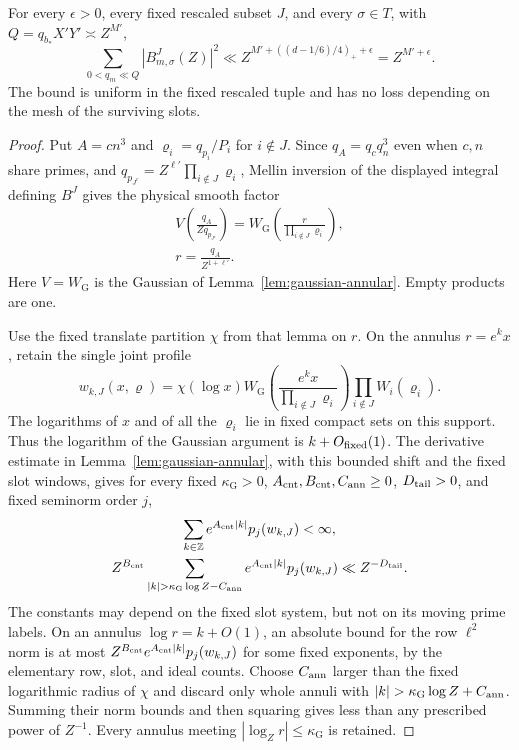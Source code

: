 \begin{lemma}\label{lem:probe-row-norm}
For every $\epsilon>0$, every fixed rescaled subset $J$, and every
$\sigma\in T$, with $Q=q_{b_*}X'Y'\asymp Z^{M'}$,
\begin{equation}
 \sum_{0<q_m\ll Q}|B^J_{m,\sigma}(Z)|^2
       \ll Z^{M'+((d-1/6)/4)_++\epsilon}
       =Z^{M'+\epsilon}.
 \label{old-eq:5.4}
\end{equation}
The bound is uniform in the fixed rescaled tuple and has no
loss depending on the mesh of the surviving slots.
\end{lemma}

\begin{proof}
Put $A=cn^3$ and $\varrho_i=q_{p_i}/P_i$ for $i\notin J$.  Since
$q_A=q_cq_n^3$ even when $c,n$ share primes, and
$q_{p_{J^c}}=Z^{\ell'}\prod_{i\notin J}\varrho_i$, Mellin inversion
of the displayed integral defining $B^J$ gives the physical smooth factor
\[
 \begin{gathered}
 V\!\left(\frac{q_A}{Zq_{p_{J^c}}}\right)
 =W_{\mathrm G}\!\left(\frac{r}{\prod_{i\notin J}\varrho_i}\right),\\
 r=\frac{q_A}{Z^{1+\ell'}}.
 \end{gathered}
\]
Here $V=W_{\mathrm G}$ is the Gaussian of
Lemma~\ref{lem:gaussian-annular}.  Empty products are one.

Use the fixed translate partition $\chi$ from that lemma on $r$.
On the annulus $r=e^kx$, retain the single joint profile
\[
 w_{k,J}(x,\boldsymbol\varrho)
 =\chi(\log x)W_{\mathrm G}\!\left(
       \frac{e^kx}{\prod_{i\notin J}\varrho_i}\right)
       \prod_{i\notin J}W_i(\varrho_i).
\]
The logarithms of $x$ and of all the $\varrho_i$ lie in fixed compact
sets on this support.  Thus the logarithm of the Gaussian argument is
$k+O_{\rm fixed}(1)$.  The derivative estimate in
Lemma~\ref{lem:gaussian-annular}, with this bounded shift and the fixed
slot windows, gives for every fixed $\kappa_{\mathrm G}>0$,
$A_{\rm cnt},B_{\rm cnt},C_{\rm ann}\ge0$, $D_{\rm tail}>0$, and
fixed seminorm order $j$,
\[
 \begin{gathered}
 \sum_{k\in\mathbb Z}e^{A_{\rm cnt}|k|}p_j(w_{k,J})<\infty,
 \\
 Z^{B_{\rm cnt}}
 \sum_{|k|>\kappa_{\mathrm G}\log Z-C_{\rm ann}}
       e^{A_{\rm cnt}|k|}p_j(w_{k,J})
       \ll Z^{-D_{\rm tail}}.
 \end{gathered}
\]
The constants may depend on the fixed slot system, but not on its moving
prime labels.  On an annulus $\log r=k+O(1)$, an absolute bound for the
row $\ell^2$ norm is at most
$Z^{B_{\rm cnt}}e^{A_{\rm cnt}|k|}p_j(w_{k,J})$ for some fixed exponents,
by the elementary row, slot, and ideal counts.  Choose $C_{\rm ann}$ larger
than the fixed logarithmic radius of $\chi$ and discard only whole annuli
with $|k|>\kappa_{\mathrm G}\log Z+C_{\rm ann}$.  Summing their norm bounds
and then squaring gives less than any prescribed power of $Z^{-1}$.
Every annulus meeting $|\log_Z r|\le\kappa_{\mathrm G}$ is retained.


\end{proof}

